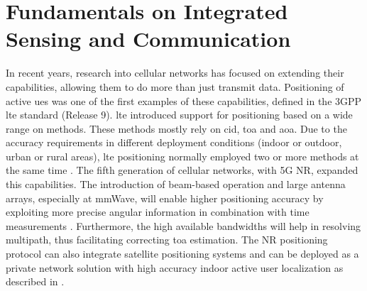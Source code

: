 \chapter{Fundamentals on Integrated Sensing and Communication}
		
		
In recent years, research into cellular networks has focused on extending their capabilities, allowing them to do more than just transmit data.
Positioning of active \glspl{ue} was one of the first examples of these capabilities, defined in the \gls{3GPP} \Gls{lte} standard (Release 9).
\gls{lte} introduced support for positioning based on a wide range on methods.
These methods mostly rely on \gls{cid}, \gls{toa} and \gls{aoa}. Due to the accuracy requirements in different deployment conditions (\ie indoor or outdoor, urban or rural areas), \gls{lte} positioning normally employed two or more methods at the same time \cite{Razavi_Gunnarsson_2018}.
The fifth generation of cellular networks, with 5G \gls{NR}, expanded this capabilities. The introduction of beam-based operation and large antenna arrays, especially at mmWave, will enable higher positioning accuracy by exploiting more precise angular information in combination with time measurements \cite{Keating_Saily_Hulkkonen_Karjalainen_2019}.
Furthermore, the high available bandwidths will help in resolving multipath, thus facilitating correcting \gls{toa} estimation.
The \gls{NR} positioning protocol can also integrate satellite positioning systems and can be deployed as a private network solution with high accuracy indoor active user localization as described in  \cite{Henninger_Abrudan_Mandelli_Arnold_Saur_Kolmonen_Klein_Schlitter_Brink_2022}. 


